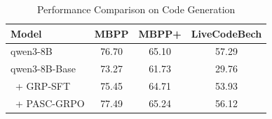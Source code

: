 \begin{table}[htbp]
\centering
\small
\caption{Performance Comparison on Code Generation}
\label{tab:find}
\begin{tabular}{lccc}
\toprule
\textbf{Model} & \textbf{MBPP} & \textbf{MBPP+} & \textbf{LiveCodeBech}\\
\midrule
qwen3-8B & 76.70 & 65.10 & 57.29 \\
\midrule
qwen3-8B-Base & 73.27 & 61.73 & 29.76 \\
~+ GRP-SFT  & 75.45 & 64.71 & 53.93 \\
~+ PASC-GRPO  & 77.49 & 65.24 & 56.12 \\
\bottomrule
\end{tabular}
\end{table}
